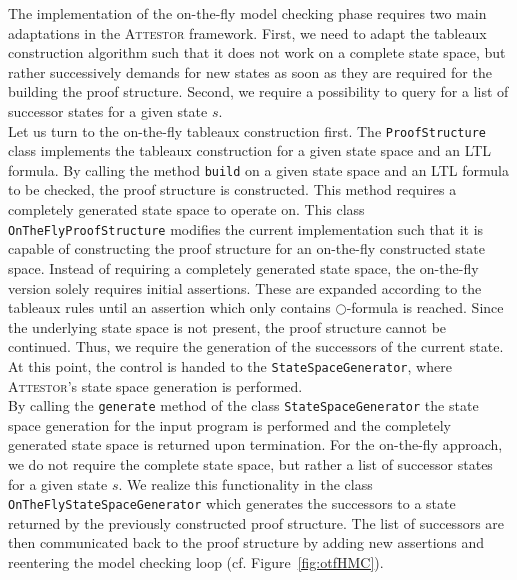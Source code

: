 \documentclass[a4paper, 12pt, twoside]{report}
\begin{document}
	The implementation of the on-the-fly model checking phase requires two main adaptations in the \textsc{Attestor} framework. First, we need to adapt the tableaux construction algorithm such that it does not work on a complete state space, but rather successively demands for new states as soon as they are required for the building the proof structure. Second, we require a possibility to query for a list of successor states for a given state $s$. \\
	
	Let us turn to the on-the-fly tableaux construction first. The \texttt{ProofStructure} class implements the tableaux construction for a given state space and an LTL formula. By calling the method \texttt{build} on a given state space and an LTL formula to be checked, the proof structure is constructed. This method requires a completely generated state space to operate on. This class \texttt{OnTheFlyProofStructure} modifies the current implementation such that it is capable of constructing the proof structure for an on-the-fly constructed state space. Instead of requiring a completely generated state space, the on-the-fly version solely requires initial assertions. These are expanded according to the tableaux rules until an assertion which only contains $\bigcirc$-formula is reached. Since the underlying state space is not present, the proof structure cannot be continued. Thus, we require the generation of the successors of the current state. At this point, the control is handed to the \texttt{StateSpaceGenerator}, where \textsc{Attestor}'s state space generation is performed.\\
	
	By calling the \texttt{generate} method of the class \texttt{StateSpaceGenerator} the state space generation for the input program is performed and the completely generated state space is returned upon termination. For the on-the-fly approach, we do not require the complete state space, but rather a list of successor states for a given state $s$. We realize this functionality in the class \texttt{OnTheFlyStateSpaceGenerator} which generates the successors to a  state returned by the previously constructed proof structure. The list of successors are then communicated back to the proof structure by adding new assertions and reentering the model checking loop (cf. Figure~\ref{fig:otfHMC}).\\
	
\end{document}
